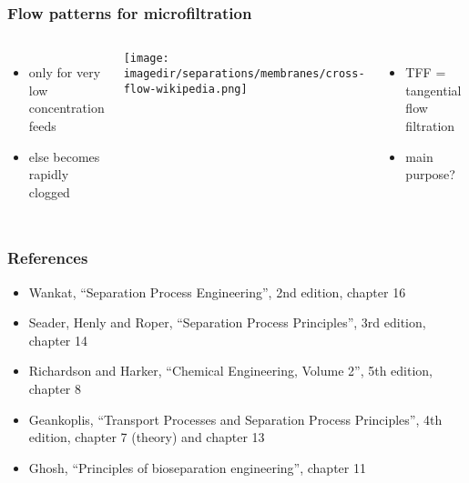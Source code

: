 \begin{frame}\frametitle{Flow patterns for microfiltration}
	\begin{columns}[t]
			{\color{myBlue}{Dead-end flow}}
			\begin{itemize}
				\item	only for very low concentration feeds
				\item	else becomes rapidly clogged
			\end{itemize}
			{\color{myBlue}{Cross-flow}}
			\begin{center}
				\texttt{[image: \\imagedir/separations/membranes/cross-flow-wikipedia.png]}
			\end{center}
			\begin{itemize}
				\item	TFF = tangential flow filtration
				\item	main purpose?
			\end{itemize}
	\end{columns}
	
\end{frame}

\begin{frame}\frametitle{References}
	\begin{itemize}
		\item	Wankat, ``Separation Process Engineering'', 2nd edition, chapter 16
		\item	Seader, Henly and Roper, ``Separation Process Principles'', 3rd edition, chapter 14
		\item	Richardson and Harker, ``Chemical Engineering, Volume 2'', 5th edition, chapter 8
		\item	Geankoplis, ``Transport Processes and Separation Process Principles'', 4th edition, chapter 7 (theory) and chapter 13
		\item	Ghosh, ``Principles of bioseparation engineering'', chapter 11
	\end{itemize}
\end{frame}

